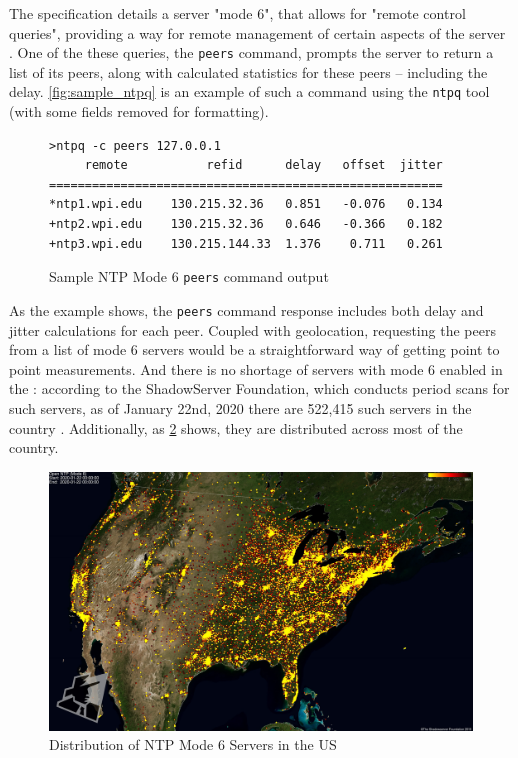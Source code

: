 The \ntp specification details a server "mode 6", that allows for "remote control queries", providing a way for remote management of certain aspects of the server \cite{Haberman2019Control4}. One of the these queries, the \texttt{peers} command, prompts the server to return a list of its peers,  along with calculated statistics for these peers -- including the delay. \autoref{fig:sample_ntpq} is an example of such a command using the \texttt{ntpq} tool (with some fields removed for formatting).

\begin{figure}[h]
    \centering
    \begin{minipage}{0.75\textwidth}
    \begin{verbatim}
>ntpq -c peers 127.0.0.1
     remote           refid      delay   offset  jitter
=======================================================
*ntp1.wpi.edu    130.215.32.36   0.851   -0.076   0.134
+ntp2.wpi.edu    130.215.32.36   0.646   -0.366   0.182
+ntp3.wpi.edu    130.215.144.33  1.376    0.711   0.261
    \end{verbatim}
    \end{minipage}
    \caption{Sample NTP Mode 6 \texttt{peers} command output}
    \label{fig:sample_ntpq}
\end{figure}

As the example shows, the \texttt{peers} command response includes both delay and jitter calculations for each peer. Coupled with \ip geolocation, requesting the peers from a list of mode 6 \ntp servers would be a straightforward way of getting point to point measurements. And there is no shortage of \ntp servers with mode 6 enabled in the \us: according to the ShadowServer Foundation, which conducts period scans for such servers, as of January 22nd, 2020 there are 522,415 such servers in the country \cite{TheShadowserverFoundationNTPProject}. Additionally, as \cref{fig:ntp_mode_6_us_map} shows, they are distributed across most of the country.

\begin{figure}[h]
    \centering
    \includegraphics{images/ntpversion_united_states_current.jpg}
    \caption{Distribution of NTP Mode 6 Servers in the US \cite{TheShadowserverFoundationNTPProject}}
    \label{fig:ntp_mode_6_us_map}
\end{figure}


